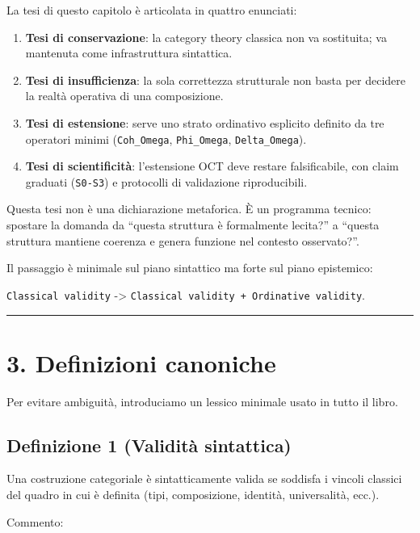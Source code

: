 La tesi di questo capitolo è articolata in quattro enunciati:

\begin{enumerate}
\def\labelenumi{\arabic{enumi}.}
\tightlist
\item
  \textbf{Tesi di conservazione}: la category theory classica non va sostituita; va mantenuta come infrastruttura sintattica.
\item
  \textbf{Tesi di insufficienza}: la sola correttezza strutturale non basta per decidere la realtà operativa di una composizione.
\item
  \textbf{Tesi di estensione}: serve uno strato ordinativo esplicito definito da tre operatori minimi (\texttt{Coh\_Omega}, \texttt{Phi\_Omega}, \texttt{Delta\_Omega}).
\item
  \textbf{Tesi di scientificità}: l'estensione OCT deve restare falsificabile, con claim graduati (\texttt{S0-S3}) e protocolli di validazione riproducibili.
\end{enumerate}

Questa tesi non è una dichiarazione metaforica. È un programma tecnico: spostare la domanda da ``questa struttura è formalmente lecita?'' a ``questa struttura mantiene coerenza e genera funzione nel contesto osservato?''.

Il passaggio è minimale sul piano sintattico ma forte sul piano epistemico:

\texttt{Classical\ validity} -\textgreater{} \texttt{Classical\ validity\ +\ Ordinative\ validity}.

\begin{center}\rule{0.5\linewidth}{0.5pt}\end{center}

\section{3. Definizioni canoniche}

Per evitare ambiguità, introduciamo un lessico minimale usato in tutto il libro.

\subsection{Definizione 1 (Validità sintattica)}

Una costruzione categoriale è sintatticamente valida se soddisfa i vincoli classici del quadro in cui è definita (tipi, composizione, identità, universalità, ecc.).

Commento:

